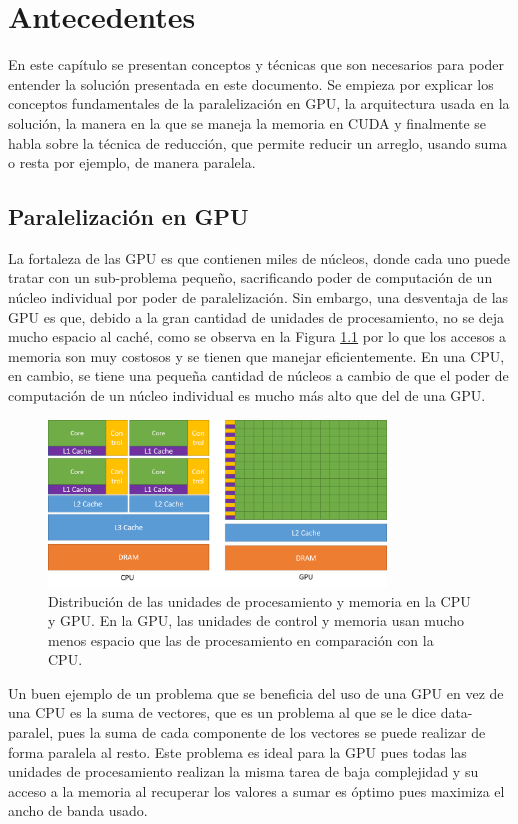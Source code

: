 \chapter{Antecedentes}\label{chap:antecedentes}
En este capítulo se presentan conceptos y técnicas que son necesarios para poder entender la solución presentada en este documento.
Se empieza por explicar los conceptos fundamentales de la paralelización en GPU, la arquitectura usada en la solución, la manera en la que se maneja la memoria en CUDA y finalmente se habla sobre la técnica de reducción, que permite reducir un arreglo, usando suma o resta por ejemplo, de manera paralela.
\section{Paralelización en GPU}\label{sec:paralelizacion}
La fortaleza de las GPU es que contienen miles de núcleos, donde cada uno puede tratar con un sub-problema pequeño, sacrificando poder de computación de un núcleo individual por poder de paralelización. Sin embargo, una desventaja de las GPU es que, debido a la gran cantidad de unidades de procesamiento, no se deja mucho espacio al caché, como se observa en la Figura \ref{fig:gpu-arch} por lo que los accesos a memoria son muy costosos y se tienen que manejar eficientemente. En una CPU, en cambio, se tiene una pequeña cantidad de núcleos a cambio de que el poder de computación de un núcleo individual es mucho más alto que del de una GPU. \cite{cuda-guide}

\begin{figure}[H]
    \centering
    \includegraphics[width=0.8\textwidth]{figs/gpu-arch.png}
\caption{Distribución de las unidades de procesamiento y memoria en la CPU y GPU. En la GPU, las unidades de control y memoria usan mucho menos espacio que las de procesamiento en comparación con la CPU.}
    \label{fig:gpu-arch}
\end{figure}

Un buen ejemplo de un problema que se beneficia del uso de una GPU en vez de una CPU es la suma de vectores, que es un problema al que se le dice data-paralel, pues la suma de cada componente de los vectores se puede realizar de forma paralela al resto. Este problema es ideal para la GPU pues todas las unidades de procesamiento realizan la misma tarea de baja complejidad y su acceso a la memoria al recuperar los valores a sumar es óptimo pues maximiza el ancho de banda usado.
